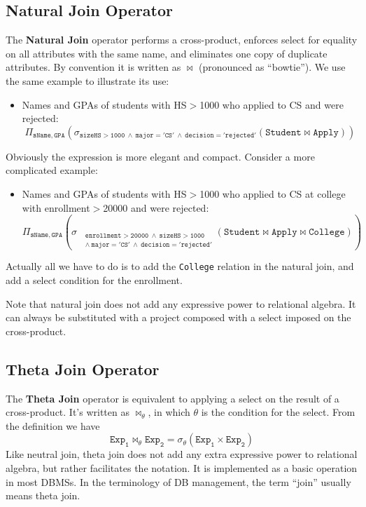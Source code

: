 \subsection{Natural Join Operator}
The \textbf{Natural Join} operator performs a cross-product, enforces select for equality on all attributes with the same name, and eliminates one copy of duplicate attributes. By convention it is written as $\bowtie$ (pronounced as ``bowtie''). We use the same example to illustrate its use:
\begin{itemize}
\item Names and GPAs of students with HS$>$1000 who applied to CS and were rejected:
\begin{equation*}
\mathtt{\Pi_{sName,GPA}\left(\sigma_{sizeHS>1000\:\land\:major='CS'\:\land\:decision='rejected'}\left(Student\bowtie Apply\right)\right)}
\end{equation*}
\end{itemize}
Obviously the expression is more elegant and compact. Consider a more complicated example:
\begin{itemize}
\item Names and GPAs of students with HS$>$1000 who applied to CS at college with enrollment$>$20000 and were rejected:
\begin{equation*}
\mathtt{\Pi_{sName,GPA}\left(\sigma_{
\begin{aligned}
&\mathtt{\scriptstyle enrollment>20000\:\land\:sizeHS>1000}\\
&\mathtt{\scriptstyle\land\:major='CS'\:\land\:decision='rejected'}
\end{aligned}
}\left(Student\bowtie Apply\bowtie College\right)\right)}
\end{equation*}
\end{itemize}
Actually all we have to do is to add the \texttt{College} relation in the natural join, and add a select condition for the enrollment.

Note that natural join does not add any expressive power to relational algebra. It can always be substituted with a project composed with a select imposed on the cross-product.
\subsection{Theta Join Operator}
The \textbf{Theta Join} operator is equivalent to applying a select on the result of a cross-product. It's written as $\bowtie_{\theta}$, in which $\theta$ is the condition for the select. From the definition we have 
\begin{equation*}
\mathtt{Exp_1\bowtie_{\theta}Exp_2 = \sigma_{\theta}(Exp_1\times Exp_2)}
\end{equation*}
Like neutral join, theta join does not add any extra expressive power to relational algebra, but rather facilitates the notation. It is implemented as a basic operation in most DBMSs. In the terminology of DB management, the term ``join'' usually means theta join. 

